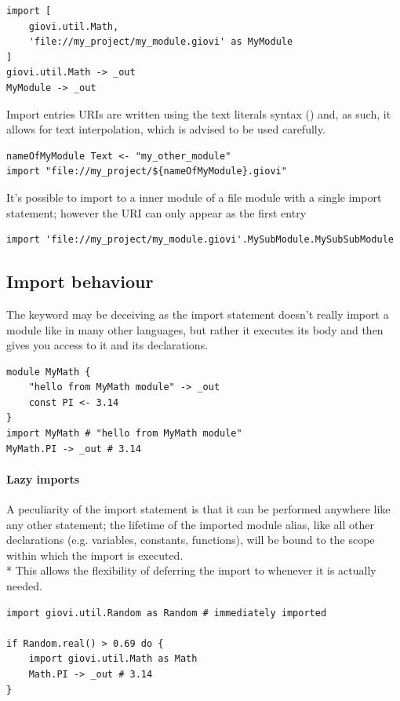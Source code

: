 \begin{verbatim}
import [
	giovi.util.Math,
	'file://my_project/my_module.giovi' as MyModule
]
giovi.util.Math -> _out
MyModule -> _out
\end{verbatim}

Import entries URIs are written using the text literals syntax
() and, as such, it allows for text interpolation, which
is advised to be used carefully.

\begin{verbatim}
nameOfMyModule Text <- "my_other_module"
import "file://my_project/${nameOfMyModule}.giovi"
\end{verbatim}

It's possible to import to a inner module of a file module with a single import
statement; however the URI can only appear as the first entry

\begin{verbatim}
import 'file://my_project/my_module.giovi'.MySubModule.MySubSubModule
\end{verbatim}

\subsection{Import behaviour}

The  keyword may be deceiving as the import statement doesn't
really import a module like in many other languages, but rather it executes its
body and then gives you access to it and its declarations.



\begin{verbatim}
module MyMath {
	"hello from MyMath module" -> _out
	const PI <- 3.14
}
import MyMath # "hello from MyMath module"
MyMath.PI -> _out # 3.14
\end{verbatim}

\paragraph{Lazy imports} A peculiarity of the import statement is that it can
be performed anywhere like any other statement; the lifetime of the imported
module alias, like all other declarations (e.g. variables, constants,
functions), will be bound to the scope within which the import is executed.\\*
This allows the flexibility of deferring the import to whenever it is actually
needed.

\begin{verbatim}
import giovi.util.Random as Random # immediately imported

if Random.real() > 0.69 do {
	import giovi.util.Math as Math
	Math.PI -> _out # 3.14
}
\end{verbatim}


